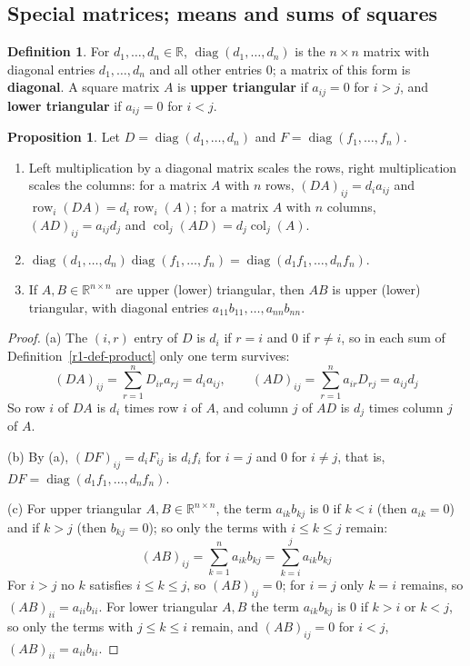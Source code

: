 \documentclass[12pt]{article}
\newcommand{\R}{\mathbb R}
\DeclareMathOperator{\row}{row}
\DeclareMathOperator{\col}{col}
\DeclareMathOperator{\diag}{diag}
\theoremstyle{definition}
\newtheorem{proposition}[theorem]{Proposition}
\newtheorem{definition}[theorem]{Definition}
\begin{document}
\subsection*{Special matrices; means and sums of squares}

\begin{definition}\label{r1-def-diag}
For \(d_1,\dots,d_n\in\R\), \(\diag(d_1,\dots,d_n)\) is the \(n\times n\) matrix with diagonal entries
\(d_1,\dots,d_n\) and all other entries \(0\); a matrix of this form is \textbf{diagonal}. A square matrix \(A\) is
\textbf{upper triangular} if \(a_{ij}=0\) for \(i>j\), and \textbf{lower triangular} if \(a_{ij}=0\) for \(i<j\).
\end{definition}

\begin{proposition}\label{r1-prop-diag}
Let \(D=\diag(d_1,\dots,d_n)\) and \(F=\diag(f_1,\dots,f_n)\).
\begin{enumerate}
\item Left multiplication by a diagonal matrix scales the rows, right multiplication scales the columns: for a
matrix \(A\) with \(n\) rows, \((DA)_{ij}=d_ia_{ij}\) and \(\row_i(DA)=d_i\row_i(A)\); for a matrix \(A\) with \(n\)
columns, \((AD)_{ij}=a_{ij}d_j\) and \(\col_j(AD)=d_j\col_j(A)\).
\item \(\diag(d_1,\dots,d_n)\diag(f_1,\dots,f_n)=\diag(d_1f_1,\dots,d_nf_n)\).
\item If \(A,B\in\R^{n\times n}\) are upper (lower) triangular, then \(AB\) is upper (lower) triangular, with
diagonal entries \(a_{11}b_{11},\dots,a_{nn}b_{nn}\).
\end{enumerate}
\end{proposition}
\begin{proof}
(a) The \((i,r)\) entry of \(D\) is \(d_i\) if \(r=i\) and \(0\) if \(r\ne i\), so in each sum of
Definition~\ref{r1-def-product} only one term survives:
\[
(DA)_{ij}=\sum_{r=1}^n D_{ir}a_{rj}=d_ia_{ij},\qquad (AD)_{ij}=\sum_{r=1}^n a_{ir}D_{rj}=a_{ij}d_j
\]
So row \(i\) of \(DA\) is \(d_i\) times row \(i\) of \(A\), and column \(j\) of \(AD\) is \(d_j\) times column \(j\)
of \(A\).

(b) By (a), \((DF)_{ij}=d_iF_{ij}\) is \(d_if_i\) for \(i=j\) and \(0\) for \(i\ne j\), that is,
\(DF=\diag(d_1f_1,\dots,d_nf_n)\).

(c) For upper triangular \(A,B\in\R^{n\times n}\), the term \(a_{ik}b_{kj}\) is \(0\) if \(k<i\) (then
\(a_{ik}=0\)) and if \(k>j\) (then \(b_{kj}=0\)); so only the terms with \(i\leqslant k\leqslant j\) remain:
\[
(AB)_{ij}=\sum_{k=1}^n a_{ik}b_{kj}=\sum_{k=i}^{j}a_{ik}b_{kj}
\]
For \(i>j\) no \(k\) satisfies \(i\leqslant k\leqslant j\), so \((AB)_{ij}=0\); for \(i=j\) only \(k=i\) remains,
so \((AB)_{ii}=a_{ii}b_{ii}\). For lower triangular \(A,B\) the term \(a_{ik}b_{kj}\) is \(0\) if \(k>i\) or
\(k<j\), so only the terms with \(j\leqslant k\leqslant i\) remain, and \((AB)_{ij}=0\) for \(i<j\),
\((AB)_{ii}=a_{ii}b_{ii}\).
\end{proof}
\end{document}
